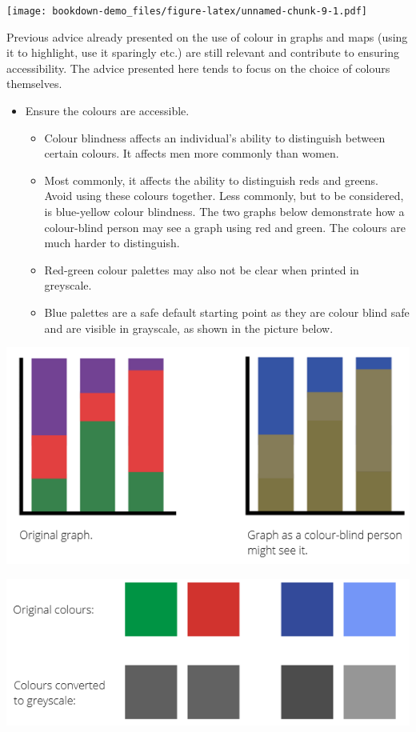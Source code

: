 \documentclass[
]{book}
\begin{document}
\texttt{[image: bookdown-demo\_files/figure-latex/unnamed-chunk-9-1.pdf]}

Previous advice already presented on the use of colour in graphs and maps (using it to highlight, use it sparingly etc.) are still relevant and contribute to ensuring accessibility. The advice presented here tends to focus on the choice of colours themselves.

\begin{itemize}
\item
  Ensure the colours are accessible.

  \begin{itemize}
  \item
    Colour blindness affects an individual's ability to distinguish between certain colours. It affects men more commonly than women.
  \item
    Most commonly, it affects the ability to distinguish reds and greens. Avoid using these colours together. Less commonly, but to be considered, is blue-yellow colour blindness. The two graphs below demonstrate how a colour-blind person may see a graph using red and green. The colours are much harder to distinguish.
  \item
    Red-green colour palettes may also not be clear when printed in greyscale.
  \item
    Blue palettes are a safe default starting point as they are colour blind safe and are visible in grayscale, as shown in the picture below.
  \end{itemize}
\end{itemize}

\includegraphics[width=1\linewidth]{img/colour_blind_graphs}

\includegraphics[width=1\linewidth]{img/colour_blind_2}
\end{document}
